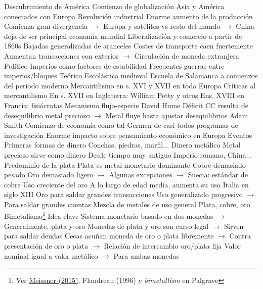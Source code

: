 \documentclass{nuevotema}
\begin{document}
\begin{esquemal}
				\4 Descubrimiento de América
				\4[] Comienzo de globalización
				\4[] Asia y América conectados con Europa
				\4 Revolución industrial
				\4[] Enorme aumento de la producción
				\4[] Comienza gran divergencia
				\4[] $\to$ Europa y satélites vs resto del mundo
				\4[] $\to$ China deja de ser principal economía mundial
				\4 Liberalización y comercio a partir de 1860s
				\4[] Bajadas generalizadas de aranceles
				\4[] Costes de transporte caen fuertemente
				\4[] Aumentan transacciones con exterior
				\4[] $\to$ Circulación de moneda extranjera
			\3 Político
				\4 Imperios como factores de estabilidad
				\4 Frecuentes guerras entre imperios/bloques
			\3 Teórico
				\4 Escolástica medieval
				\4 Escuela de Salamanca a comienzos del periodo moderno
				\4 Mercantilismo en s. XVI y XVII en toda Europa
				\4 Críticas al mercantilismo
				\4[] En s. XVII en Inglaterra: William Petty y otros
				\4[] Ens. XVIII en Francia: fisiócratas
				\4 Mecanismo flujo-especie
				\4[] David Hume
				\4[] Déficit CC resulta de desequilibrio metal precioso
				\4[] $\to$ Metal fluye hasta ajustar desequilibrios
				\4 Adam Smith
				\4[] Comienzo de economía como tal
				\4[] Germen de casi todos programas de investigación
				\4[] Enorme impacto sobre pensamiento económico en Europa
		\2 Eventos
			\3 Primeras formas de dinero
				\4 Conchas, piedras, marfil...
			\3 Dinero metálico
				\4 Metal precioso sirve como dinero
				\4[] Desde tiempo muy antiguo
				\4 Imperio romano, China...
			\3 Predominio de la plata
				\4 Plata es metal monetario dominante
				\4[] Cobre demasiado pesado
				\4[] Oro demasiado ligero
				\4[] $\to$ Algunas excepciones
				\4[] $\to$ Suecia: estándar de cobre
			\3 Uso creciente del oro
				\4 A lo largo de edad media, aumenta su uso
				\4 Italia en siglo XIII
				\4[] Oro para saldar grandes transacciones
				\4 Uso generalizado progresivo
				\4[] $\to$ Para saldar grandes cuentas
				\4[$\then$] Mezcla de metales de uso general
				\4[] Plata, cobre, oro
			\3 Bimetalismo\footnote{Ver \href{https://www.nber.org/papers/w20852.pdf}{Meissner (2015)}, Flandreau (1996) y \textit{bimetallism} en Palgrave}
				\4 Idea clave
				\4[] Sistema monetario basado en dos monedas
				\4[] $\to$ Generalmente, plata y oro
				\4[] Monedas de plata y oro son curso legal
				\4[] $\to$ Sirven para saldar deudas
				\4[] Cecas acuñan moneda de oro o plata libremente
				\4[] $\to$ Contra presentación de oro o plata
				\4[] $\to$ Relación de intercambio oro/plata fija
				\4[] Valor nominal igual a valor metálico
				\4[] $\to$ Para ambas monedas

\end{esquemal}
\end{document}
